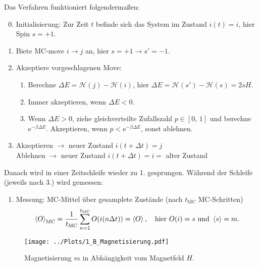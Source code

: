 Das Verfahren funktioniert folgendermaßen:
\begin{enumerate}
\setcounter{enumi}{-1}
\item Initialisierung: Zur Zeit $t$ befinde sich das System im Zustand $i(t)=i$, hier Spin $s=+1$.
\item Biete MC-move $i\rightarrow j$ an, hier $s=+1\rightarrow s'=-1$.
\item Akzeptiere vorgeschlagenen Move:
\begin{enumerate}
\item Berechne $\Delta E=\mathcal{H}(j)-\mathcal{H}(i)$, hier $\Delta E=\mathcal{H}(s')-\mathcal{H}(s)=2sH$.
\item Immer akzeptieren, wenn $\Delta E<0$.
\item Wenn $\Delta E>0$, ziehe gleichverteilte Zufallszahl $p\in[0,\,1]$ und berechne $\mathrm{e}^{-\beta\Delta E}$. Akzeptieren, wenn $p<\mathrm{e}^{-\beta\Delta E}$, sonst ablehnen.
\end{enumerate}
\item Akzeptieren $\rightarrow$ neuer Zustand $i(t+\Delta t)=j$\\Ablehnen $\rightarrow$ neuer Zustand $i(t+\Delta t)=i=$ alter Zustand
\end{enumerate}
Danach wird in einer Zeitschleife wieder zu 1. gesprungen. Während der Schleife (jeweils nach 3.) wird gemessen:
\begin{enumerate}[resume]
\item Messung: MC-Mittel über gesamplete Zustände (nach $t_\text{MC}$ MC-Schritten)
\[\braket{O}_\text{MC}=\frac{1}{t_\text{MC}}\sum_{n=1}^{t_\text{MC}}O(i(n\Delta t))=\braket{O},~~~\text{hier }O(i)=s~\text{und }\braket{s}=m.\]
\end{enumerate}

\begin{figure}[H]
\centering
\texttt{[image: ../Plots/1\_B\_Magnetisierung.pdf]}
\caption{Magnetisierung $m$ in Abhängigkeit vom Magnetfeld $H$.}
\label{fig:Magnetisierung}
\end{figure}